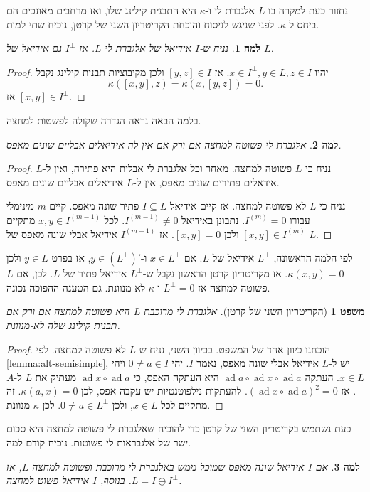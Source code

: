 \documentclass{report}
\theoremstyle{break}
\newtheorem{theorem}{משפט}[chapter]
\newtheorem{lemma}[lemma]{למה}
\theoremstyle{MyNonumberbreak}
\newtheorem{proof}{הוכחה}
\DeclareMathOperator{\ad}{ad} %
\begin{document}
נחזור כעת למקרה בו $L$ אלגברת לי ו-$\kappa$ היא התבנית קילינג שלו, ואז מרחבים מאונכים הם ביחס ל-$\kappa$. לפני שניגש לניסוח והוכחת הקריטריון השני של קרטן, נוכיח שתי למות.
\begin{lemma} \label{lemma:perp-ideal}
	נניח ש-$I$ אידיאל של אלגברת לי $L$. אז $I^\perp$ גם אידיאל של $L$.
\end{lemma}
\begin{proof}
	יהיו $x \in I^\perp, y \in L, z \in I$. אז $[y, z] \in I$ ולכן מקיבוציות תבנית קילינג נקבל
	\[ \kappa([x, y], z) = \kappa(x, [y, z]) = 0. \]
	אז $[x, y] \in I^\perp$.
\end{proof}
בלמה הבאה נראה הגדרה שקולה לפשטות למחצה.
\begin{lemma} \label{lemma:alt-semisimple}
	אלגברת לי פשוטה למחצה אם ורק אם אין לה אידיאלים אבליים שונים מאפס.
\end{lemma}
\begin{proof}
	נניח כי $L$ פשוטה למחצה. מאחר וכל אלגברת לי אבלית היא פתירה, ואין ל-$L$ אידאלים פתירים שונים מאפס, אין ל-$L$ אידיאלים אבליים שונים מאפס.

	נניח כי $L$ לא פשוטה למחצה. אז קיים אידיאל $I \subseteq L$ פתיר שונה מאפס. קיים $m$ מינימלי עבורו $I^{(m)} = 0$. נתבונן באידיאל $I^{(m-1)} \neq 0$. לכל $x, y \in I^{(m-1)}$ מתקיים $[x, y] \in I^{(m)}$ ולכן $[x, y] = 0$. אז $I^{(m-1)}$ אידיאל אבלי שונה מאפס של $L$.
\end{proof}
לפי הלמה הראשונה, $L^\perp$ אידיאל של $L$. אם $x \in L^\perp$ ו-$y \in (L^\perp)'$, אז בפרט $y \in L$ ולכן $\kappa(x, y) = 0$. אז מקריטריון קרטן הראשון נקבל ש-$L^\perp$ אידיאל פתיר של $L$. לכן, אם $L$ פשוטה למחצה אז $L^\perp = 0$ ו-$\kappa$ לא-מנוונת. גם הטענה ההפוכה נכונה.
\begin{theorem}[הקריטריון השני של קרטן]
	אלגברת לי מרוכבת $L$ היא פשוטה למחצה אם ורק אם תבנית קילינג שלה לא-מנוונת.
\end{theorem}
\begin{proof}
	הוכחנו כיוון אחד של המשפט. בכיוון השני, נניח ש-$L$ לא פשוטה למחצה. לפי \autoref*{lemma:alt-semisimple}, יש ל-$L$ אידיאל אבלי שונה מאפס, נאמר $I$. יהי $0 \neq a \in I$ ויהי $x \in L$. העתקה $\ad a \circ \ad x \circ \ad a$ היא העתקה האפס, כי $\ad x \circ \ad a$ מעתיק את $L$ ל-$A$. אז $(\ad x \circ \ad a)^2 = 0$. להעתקות נילפוטנטיות יש עקבה אפס, לכן $\kappa(a, x) = 0$. זה מתקיים לכל $x \in L$, ולכן $0 \neq a \in L^\perp$. לכן $\kappa$ מנוונת.
\end{proof}
כעת נשתמש בקריטריון השני של קרטן כדי להוכיח שאלגברת לי פשוטה למחצה היא סכום ישר של אלגבראות לי פשוטות. נוכיח קודם למה.
\begin{lemma}
	אם $I$ אידיאל שונה מאפס שמוכל ממש באלגברת לי מרוכבת ופשוטה למחצה $L$, אז $L = I \oplus I^\perp$. בנוסף, $I$ אידיאל פשוט למחצה.
\end{lemma}
\end{document}
